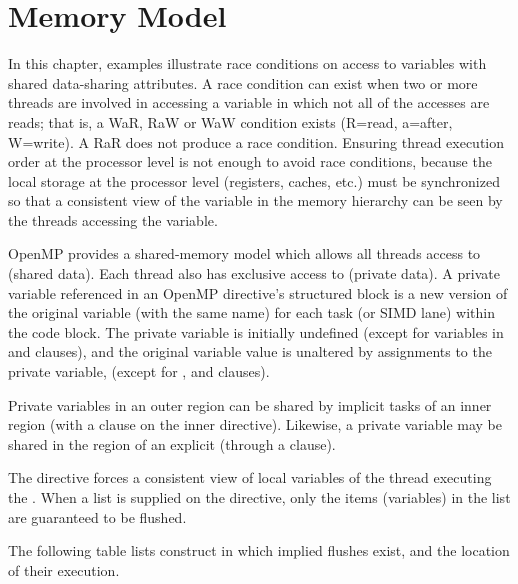 \pagebreak
\chapter{Memory Model}
\label{chap:memory_model}

In this chapter, examples illustrate race conditions on access to variables with
shared data-sharing attributes.  A race condition can exist when two
or more threads are involved in accessing a variable in which not all
of the accesses are reads; that is, a WaR, RaW or WaW condition
exists (R=read, a=after, W=write). A RaR does not produce a race condition.
 Ensuring thread execution order at
the processor level is not enough to avoid race conditions, because the
local storage at the processor level (registers, caches, etc.)
must be synchronized so that a consistent view of the variable in the
memory hierarchy can be seen by the threads accessing the variable.

OpenMP provides a shared-memory model which allows all threads access
to  (shared data).  Each thread also has exclusive
access to  (private data).  A private
variable referenced in an OpenMP directive's structured block is a
new version of the original variable (with the same name) for each
task (or SIMD lane) within the code block.  The private variable is
initially undefined (except for variables in 
and  clauses), and the original variable value is
unaltered by assignments to the private variable, (except for
,  and  clauses).

Private variables in an outer  region can be
shared by implicit tasks of an inner  region 
(with a  clause on the inner  directive).
Likewise, a private variable may be shared in the region of an
explicit  (through a  clause).


The  directive forces a  consistent view of local variables
of the thread executing the .
When a list is supplied on the directive, only the items (variables)
in the list are guaranteed to be flushed.

The following table lists construct in which implied flushes exist, and the
location of their execution.

